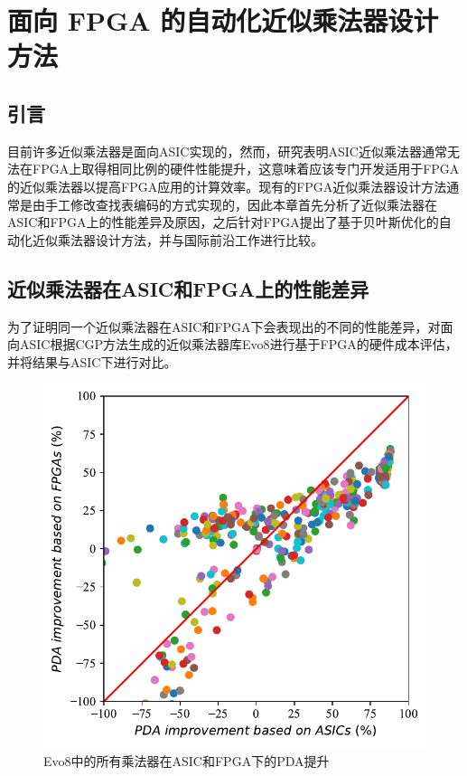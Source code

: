 \chapter{面向 FPGA 的自动化近似乘法器设计方法}

\section{引言}

目前许多近似乘法器是面向ASIC实现的，然而，研究表明ASIC近似乘法器通常无法在FPGA上取得相同比例的硬件性能提升\cite{AC:AM:FPGA:SMApproxLib}，这意味着应该专门开发适用于FPGA的近似乘法器以提高FPGA应用的计算效率。现有的FPGA近似乘法器设计方法通常是由手工修改查找表编码的方式实现的，因此本章首先分析了近似乘法器在ASIC和FPGA上的性能差异及原因，之后针对FPGA提出了基于贝叶斯优化的自动化近似乘法器设计方法，并与国际前沿工作进行比较。


\section{近似乘法器在ASIC和FPGA上的性能差异}

为了证明同一个近似乘法器在ASIC和FPGA下会表现出的不同的性能差异，对面向ASIC根据CGP方法生成的近似乘法器库Evo8\cite{AC:AM:CGP_Evoapprox8b}进行基于FPGA的硬件成本评估，并将结果与ASIC下进行对比。

\begin{figure}[!ht]
    \centering
    \includegraphics[width=0.7\linewidth]{./figs/AC-AM-AMG-Evo8_ASIC_FPGA.pdf}
    \caption{Evo8中的所有乘法器在ASIC和FPGA下的PDA提升}
    \label{AC:AM:AMG:Fig:Evo8_ASIC_FPGA.pdf}
\end{figure}

